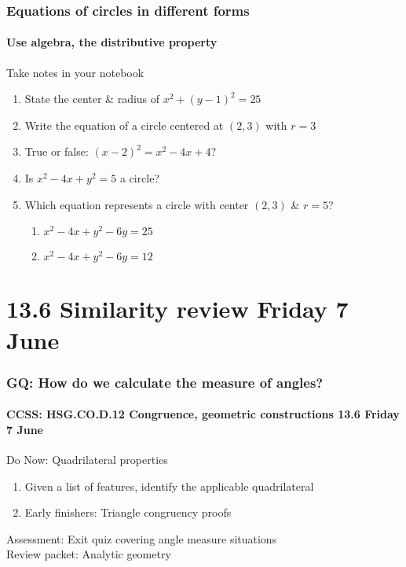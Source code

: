 \documentclass{beamer}
\begin{document}
    \frame
    {
      \frametitle{Equations of circles in different forms}
      \framesubtitle{Use algebra, the distributive property}

      \begin{block}{Take notes in your notebook}
        \begin{enumerate}
          \item State the center \& radius of $x^2+(y-1)^2=25$
          \item Write the equation of a circle centered at $(2,3)$ with $r=3$
          \item True or false: $(x-2)^2=x^2-4x+4$?
          \item Is $x^2-4x+y^2 = 5$ a circle?
          \item Which equation represents a circle with center $(2,3)$ \& $r=5$?
          \begin{enumerate}
            \item $x^2-4x+y^2-6y = 25$ \vspace{0.25cm}
            \item $x^2-4x+y^2-6y = 12$
          \end{enumerate}
        \end{enumerate}
      \end{block}
      }

  \section{13.6 Similarity review Friday 7 June}
    \frame
    {
      \frametitle{GQ: How do we calculate the measure of angles?}
      \framesubtitle{CCSS: HSG.CO.D.12 Congruence, geometric constructions \hfill \alert{13.6 Friday 7 June}}

      \begin{block}{Do Now: Quadrilateral properties}
        \begin{enumerate}
          \item Given a list of features, identify the applicable quadrilateral
          \item Early finishers: Triangle congruency proofs
        \end{enumerate}
      \end{block}
      Assessment: Exit quiz covering angle measure situations\\
      Review packet: Analytic geometry
    }
\end{document}
